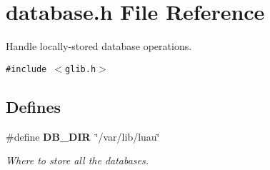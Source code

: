 \section{database.h File Reference}
\label{database_8h}
Handle locally-stored database operations.  


{\tt \#include $<$glib.h$>$}\par
\subsection*{Defines}
\begin{CompactItemize}
\item 
\#define {\bf DB\_\-DIR}\ \char`\"{}/var/lib/luau\char`\"{}
\begin{CompactList}\small\item\em Where to store all the databases. \item\end{CompactList}\end{CompactItemize}
